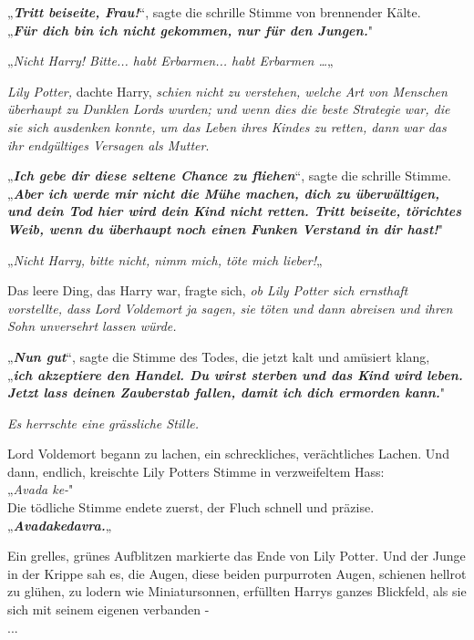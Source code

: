 {„\textbf{\emph{Tritt beiseite, Frau!}}“, sagte die schrille Stimme von brennender Kälte.\\ „\textbf{\emph{Für dich bin ich nicht gekommen, nur für den Jungen.}}"

„\emph{Nicht Harry! Bitte... habt Erbarmen... habt Erbarmen …}„

\emph{Lily Potter,} dachte Harry, \emph{schien nicht zu verstehen, welche Art von Menschen überhaupt zu Dunklen Lords wurden; und wenn dies die beste Strategie war, die sie sich ausdenken konnte, um das Leben ihres Kindes zu retten, dann war das ihr endgültiges Versagen als Mutter}.

„\textbf{\emph{Ich gebe dir diese seltene Chance zu fliehen}}“, sagte die schrille Stimme.\\ „\textbf{\emph{Aber ich werde mir nicht die Mühe machen, dich zu überwältigen, und dein Tod hier wird dein Kind nicht retten. Tritt beiseite, törichtes Weib, wenn du überhaupt noch einen Funken Verstand in dir hast!}}"

„\emph{Nicht Harry, bitte nicht, nimm mich, töte mich lieber!}„

Das leere Ding, das Harry war, fragte sich, \emph{ob Lily Potter sich ernsthaft vorstellte, dass Lord Voldemort ja sagen, sie töten und dann abreisen und ihren Sohn unversehrt lassen würde.}

„\textbf{\emph{Nun gut}}“, sagte die Stimme des Todes, die jetzt kalt und amüsiert klang,\\ „\textbf{\emph{ich akzeptiere den Handel. Du wirst sterben und das Kind wird leben. Jetzt lass deinen Zauberstab fallen, damit ich dich ermorden kann.}}"

\emph{Es herrschte eine grässliche Stille.}

Lord Voldemort begann zu lachen, ein schreckliches, verächtliches Lachen. Und dann, endlich, kreischte Lily Potters Stimme in verzweifeltem Hass:\\ „\emph{Avada ke-}"\\ Die tödliche Stimme endete zuerst, der Fluch schnell und präzise.\\ „\textbf{\emph{Avadakedavra.}}„

Ein grelles, grünes Aufblitzen markierte das Ende von Lily Potter. Und der Junge in der Krippe sah es, die Augen, diese beiden purpurroten Augen, schienen hellrot zu glühen, zu lodern wie Miniatursonnen, erfüllten Harrys ganzes Blickfeld, als sie sich mit seinem eigenen verbanden -\\ ...

}
